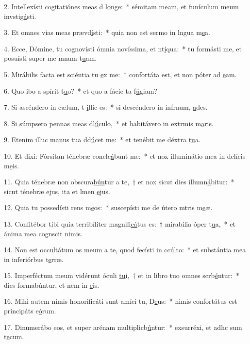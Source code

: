 2. Intellexísti cogitatiónes meas d l\uline{o}nge:~* sémitam meam, et funículum meum invstig\uline{á}sti.\par 
3. Et omnes vias meas prævd\uline{í}sti:~* quia non est sermo in lngua m\uline{e}a.\par 
4. Ecce, Dómine, tu cognovísti ómnia novíssima, et nt\uline{í}qua:~* tu formásti me, et posuísti super me mnum t\uline{u}am.\par 
5. Mirábilis facta est sciéntia tu \uline{e}x me:~* confortáta est, et non póter ad \uline{e}am.\par 
6. Quo ibo a spírit t\uline{u}o?~* et quo a fácie ta f\uline{ú}giam?\par 
7. Si ascéndero in cælum, t \uline{i}llic es:~* si descéndero in infrnum, \uline{a}des.\par 
8. Si súmpsero pennas meas dl\uline{ú}culo,~* et habitávero in extrmis m\uline{a}ris.\par 
9. Etenim illuc manus tua dd\uline{ú}cet me:~* et tenébit me déxtra t\uline{u}a.\par 
10. Et dixi: Fórsitan ténebræ conclc\uline{á}bunt me:~* et nox illuminátio mea in delícis m\uline{e}is.\par 
11. Quia ténebræ non obscura\uline{bún}tur a te,~† et nox sicut dies illumn\uline{á}bitur:~* sicut ténebræ ejus, ita et lmen \uline{e}jus.\par 
12. Quia tu possedísti rens m\uline{e}os:~* suscepísti me de útero mtris m\uline{e}æ.\par 
13. Confitébor tibi quia terribíliter magnifi\uline{cá}tus es:~† mirabília óper t\uline{u}a,~* et ánima mea cognscit n\uline{i}mis.\par 
14. Non est occultátum os meum a te, quod fecísti in cc\uline{ú}lto:~* et substántia mea in inferiórbus t\uline{e}rræ.\par 
15. Imperféctum meum vidérunt óculi \uline{tu}i,~† et in libro tuo omnes scrb\uline{é}ntur:~* dies formabúntur, et nem in \uline{e}is.\par 
16. Mihi autem nimis honorificáti sunt amíci tu, D\uline{e}us:~* nimis confortátus est principáts e\uline{ó}rum.\par 
17. Dinumerábo eos, et super arénam multiplicb\uline{ú}ntur:~* exsurréxi, et adhc sum t\uline{e}cum.\par 
